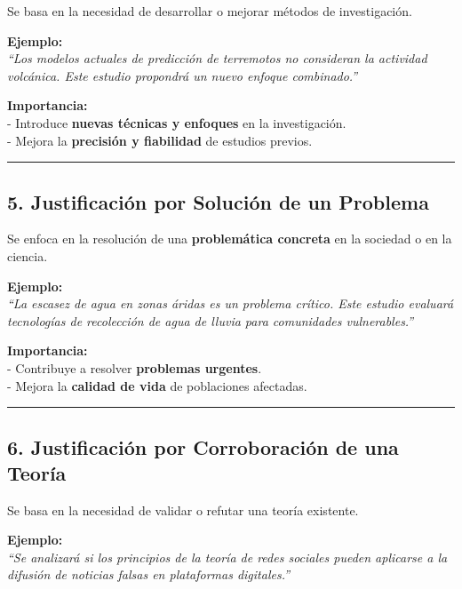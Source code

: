 \documentclass[
  letterpaper,
  DIV=11,
  numbers=noendperiod]{scrartcl}
\begin{document}
Se basa en la necesidad de desarrollar o mejorar métodos de
investigación.

\textbf{Ejemplo:}\\
\emph{``Los modelos actuales de predicción de terremotos no consideran
la actividad volcánica. Este estudio propondrá un nuevo enfoque
combinado.''}

\textbf{Importancia:}\\
- Introduce \textbf{nuevas técnicas y enfoques} en la investigación.\\
- Mejora la \textbf{precisión y fiabilidad} de estudios previos.

\begin{center}\rule{0.5\linewidth}{0.5pt}\end{center}

\subsection{\texorpdfstring{\textbf{5. Justificación por Solución de un
Problema}}{5. Justificación por Solución de un Problema}}\label{justificaciuxf3n-por-soluciuxf3n-de-un-problema}

Se enfoca en la resolución de una \textbf{problemática concreta} en la
sociedad o en la ciencia.

\textbf{Ejemplo:}\\
\emph{``La escasez de agua en zonas áridas es un problema crítico. Este
estudio evaluará tecnologías de recolección de agua de lluvia para
comunidades vulnerables.''}

\textbf{Importancia:}\\
- Contribuye a resolver \textbf{problemas urgentes}.\\
- Mejora la \textbf{calidad de vida} de poblaciones afectadas.

\begin{center}\rule{0.5\linewidth}{0.5pt}\end{center}

\subsection{\texorpdfstring{\textbf{6. Justificación por Corroboración
de una
Teoría}}{6. Justificación por Corroboración de una Teoría}}\label{justificaciuxf3n-por-corroboraciuxf3n-de-una-teoruxeda}

Se basa en la necesidad de validar o refutar una teoría existente.

\textbf{Ejemplo:}\\
\emph{``Se analizará si los principios de la teoría de redes sociales
pueden aplicarse a la difusión de noticias falsas en plataformas
digitales.''}
\end{document}
